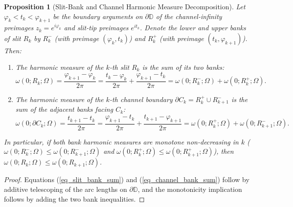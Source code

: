 \documentclass[11pt,reqno]{amsart}
\newtheorem{prop}[thm]{Proposition}
\numberwithin{equation}{section}
\renewcommand{\phi}{\varphi}
\newcommand{\D}{\mathbb{D}}
\begin{document}
\begin{prop}[Slit-Bank and Channel Harmonic Measure Decomposition] \label{prop_bank_channel_decomp}
Let $\phi_k < t_k < \phi_{k+1}$ be the boundary arguments on $\partial\D$ of the channel-infinity preimages $z_k = e^{i\phi_k}$ and slit-tip preimages $e^{it_k}$. Denote the lower and upper banks of slit $R_k$ by $R_k^-$ (with preimage $(\phi_k, t_k)$) and $R_k^+$ (with preimage $(t_k, \phi_{k+1})$). Then:
\begin{enumerate}
\item The harmonic measure of the $k$-th slit $R_k$ is the sum of its two banks:
\begin{equation} \label{eq_slit_bank_sum}
  \omega(0; R_k; \varOmega) = \frac{\phi_{k+1} - \phi_k}{2\pi} = \frac{t_k - \phi_k}{2\pi} + \frac{\phi_{k+1} - t_k}{2\pi} = \omega(0; R_k^-; \varOmega) + \omega(0; R_k^+; \varOmega).
\end{equation}
\item The harmonic measure of the $k$-th channel boundary $\partial C_k = R_k^+ \cup R_{k+1}^-$ is the sum of the adjacent banks facing $C_k$:
\begin{equation} \label{eq_channel_bank_sum}
  \omega(0; \partial C_k; \varOmega) = \frac{t_{k+1} - t_k}{2\pi} = \frac{\phi_{k+1} - t_k}{2\pi} + \frac{t_{k+1} - \phi_{k+1}}{2\pi} = \omega(0; R_k^+; \varOmega) + \omega(0; R_{k+1}^-; \varOmega).
\end{equation}
\end{enumerate}
In particular, if both bank harmonic measures are monotone non-decreasing in $k$ ($\omega(0; R_k^-; \varOmega) \le \omega(0; R_{k+1}^-; \varOmega)$ and $\omega(0; R_k^+; \varOmega) \le \omega(0; R_{k+1}^+; \varOmega)$), then $\omega(0; R_k; \varOmega) \le \omega(0; R_{k+1}; \varOmega)$.
\end{prop}
\begin{proof}
Equations (\ref{eq_slit_bank_sum}) and (\ref{eq_channel_bank_sum}) follow by additive telescoping of the arc lengths on $\partial\D$, and the monotonicity implication follows by adding the two bank inequalities.
\end{proof}
\end{document}

